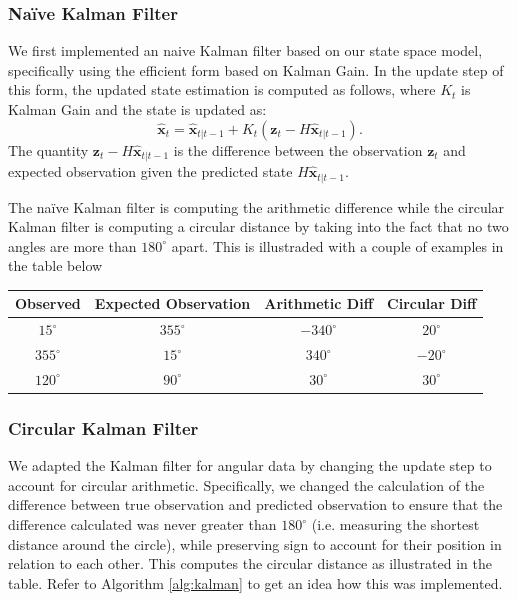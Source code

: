 \documentclass[11pt]{amsart}
\begin{document}
\subsubsection{Naïve Kalman Filter}
We first implemented an naive Kalman filter based on our state space model, specifically using the efficient form based on Kalman Gain. In the update step of this form, the updated state estimation is computed as follows, 
where $K_t$ is Kalman Gain and the state is updated as: \[\mathbf{\hat{x}}_t = \mathbf{\hat{x}}_{t|t-1} + K_t(\mathbf{z}_t - H\mathbf{\hat{x}}_{t|t-1}).\] The quantity $\mathbf{z}_t - H\mathbf{\hat{x}}_{t|t-1}$ is the difference between the observation $\mathbf{z}_t$ 
and expected observation given the predicted state $H\mathbf{\hat{x}}_{t|t-1}$.

The naïve Kalman filter is computing the arithmetic difference while the circular Kalman filter is computing a circular distance by taking into the fact that no two angles are more than
$180^{\circ}$ apart. This is illustraded with a couple of examples in the table below

\begin{center}
    \begin{tabular}{||c c c c||}
     \hline
     Observed & Expected Observation & Arithmetic Diff & Circular Diff \\ 
     \hline\hline
     $15^{\circ}$ & $355^{\circ}$ & $-340^{\circ}$ & $20^{\circ}$ \\ 
     \hline
     $355^{\circ}$ & $15^{\circ}$ &  $340^{\circ}$ & $-20^{\circ}$ \\
     \hline
     $120^{\circ}$ & $90^{\circ}$ & $30^{\circ}$ & $30^{\circ}$ \\ [1ex] 
     \hline
    \end{tabular}
    \end{center}



\subsubsection{Circular Kalman Filter}
We adapted the Kalman filter for angular data by changing the update step to account for circular arithmetic. Specifically, we changed the calculation of the difference between true 
observation and predicted observation to ensure that the difference calculated was never greater than $180^{\circ}$ (i.e. measuring the shortest distance around the circle), while preserving 
sign to account for their position in relation to each other. This computes the circular distance as illustrated in the table. Refer to Algorithm \ref{alg:kalman} to get an idea how this was 
implemented.
\end{document}
